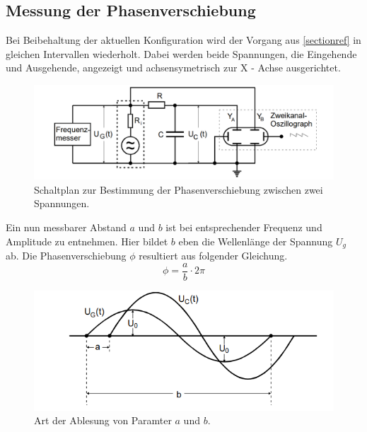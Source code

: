 \subsection{Messung der Phasenverschiebung}
Bei Beibehaltung der aktuellen Konfiguration wird der Vorgang aus \ref{sectionref} in gleichen Intervallen
wiederholt. Dabei werden beide Spannungen, die Eingehende und Ausgehende, angezeigt und achsensymetrisch
zur X - Achse ausgerichtet.\\
\begin{figure}
    \centering 
    \includegraphics[width=\textwidth]{bilder/jetzt.png}
    \caption{Schaltplan zur Bestimmung der Phasenverschiebung zwischen zwei Spannungen.\cite{skript}}
    \label{fig:ab}
\end{figure} 
Ein nun messbarer Abstand $a$ und $b$ %
ist bei entsprechender Frequenz und Amplitude zu entnehmen. Hier bildet $b$ eben die Wellenlänge
der Spannung $U_g$ ab. Die Phasenverschiebung $\phi$ resultiert aus folgender Gleichung.
\begin{equation}
    \label{eqn:phi}
    \phi= \frac{a}{b} \cdot 2 \pi
\end{equation}

\begin{figure}
    \centering
    \includegraphics[width=\textwidth]{bilder/ab2.png}
    \caption{Art der Ablesung von Paramter $a$ und $b$.\cite{skript}}
    \label{fig:ab}
\end{figure}
